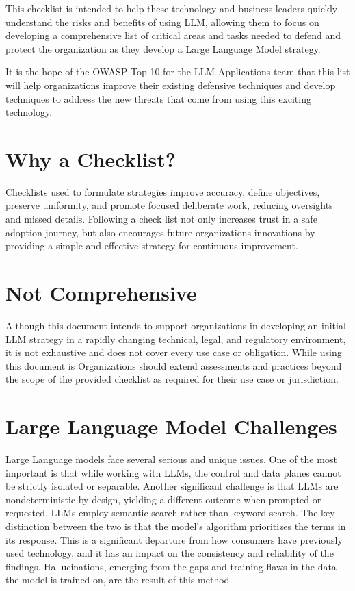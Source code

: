 This checklist is intended to help these technology and business leaders quickly
understand the risks and benefits of using LLM, allowing them to focus on
developing a comprehensive list of critical areas and tasks needed to defend
and protect the organization as they develop a Large Language Model strategy.

It is the hope of the OWASP Top 10 for the LLM Applications team that this list
will help organizations improve their existing defensive techniques and develop
techniques to address the new threats that come from using this exciting
technology.

\section{Why a Checklist?}
Checklists used to formulate strategies improve accuracy, define objectives,
preserve uniformity, and promote focused deliberate work, reducing oversights
and missed details. Following a check list not only increases trust in a safe
adoption journey, but also encourages future organizations innovations by
providing a simple and effective strategy for continuous improvement.

\section{Not Comprehensive}
Although this document intends to support organizations in developing an
initial LLM strategy in a rapidly changing technical, legal, and regulatory
environment, it is not exhaustive and does not cover every use case or
obligation. While using this document is Organizations should extend
assessments and practices beyond the scope of the provided checklist as
required for their use case or jurisdiction.

\section{Large Language Model Challenges}
Large Language models face several serious and unique issues. One of the most
important is that while working with LLMs, the control and data planes cannot
be strictly isolated or separable. Another significant challenge is that LLMs
are nondeterministic by design, yielding a different outcome when prompted or
requested. LLMs employ semantic search rather than keyword search. The key
distinction between the two is that the model's algorithm prioritizes the terms
in its response. This is a significant departure from how consumers have
previously used technology, and it has an impact on the consistency and
reliability of the findings. Hallucinations, emerging from the gaps and
training flaws in the data the model is trained on, are the result of this
method.

